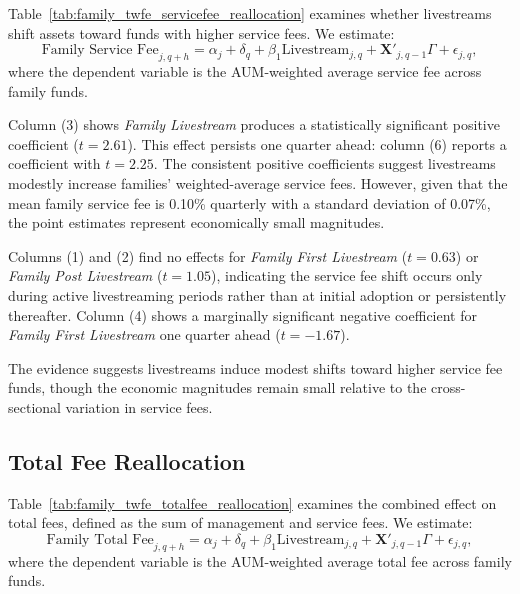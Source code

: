 \documentclass[12pt]{article}
\begin{document}
Table~\ref{tab:family_twfe_servicefee_reallocation} examines whether livestreams shift assets toward funds with higher service fees. We estimate:
\begin{equation}
    \label{eq:family_service_fee}
    \text{Family Service Fee}_{j,q+h} = \alpha_j + \delta_q + \beta_1 \text{Livestream}_{j,q} + \mathbf{X}'_{j,q-1} \Gamma + \epsilon_{j,q},
\end{equation}
where the dependent variable is the AUM-weighted average service fee across family funds.

Column (3) shows \textit{Family Livestream} produces a statistically significant positive coefficient ($t = 2.61$). This effect persists one quarter ahead: column (6) reports a coefficient with $t = 2.25$. The consistent positive coefficients suggest livestreams modestly increase families' weighted-average service fees. However, given that the mean family service fee is 0.10\% quarterly with a standard deviation of 0.07\%, the point estimates represent economically small magnitudes.

Columns (1) and (2) find no effects for \textit{Family First Livestream} ($t = 0.63$) or \textit{Family Post Livestream} ($t = 1.05$), indicating the service fee shift occurs only during active livestreaming periods rather than at initial adoption or persistently thereafter. Column (4) shows a marginally significant negative coefficient for \textit{Family First Livestream} one quarter ahead ($t = -1.67$).

The evidence suggests livestreams induce modest shifts toward higher service fee funds, though the economic magnitudes remain small relative to the cross-sectional variation in service fees.

\subsection{Total Fee Reallocation}\label{subsec:total_fee_reallocation}

Table~\ref{tab:family_twfe_totalfee_reallocation} examines the combined effect on total fees, defined as the sum of management and service fees. We estimate:
\begin{equation}
    \label{eq:family_total_fee}
    \text{Family Total Fee}_{j,q+h} = \alpha_j + \delta_q + \beta_1 \text{Livestream}_{j,q} + \mathbf{X}'_{j,q-1} \Gamma + \epsilon_{j,q},
\end{equation}
where the dependent variable is the AUM-weighted average total fee across family funds.
\end{document}
